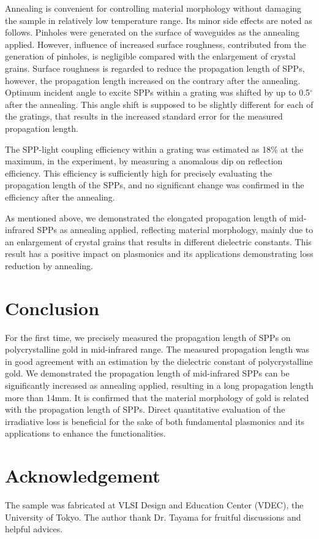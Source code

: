\documentclass[twocolumn,11pt,a4]{article}
\begin{document}
Annealing is convenient for controlling material morphology\cite{Nogues} without damaging the sample in relatively low temperature range. Its minor side effects are noted as follows.
Pinholes were generated on the surface of waveguides as the annealing applied. However, influence of increased surface roughness, contributed from the generation of pinholes, is negligible compared with the enlargement of crystal grains. Surface roughness is regarded to reduce the propagation length of SPPs\cite{Mills}, however, the propagation length increased on the contrary after the annealing.
Optimum incident angle to excite SPPs within a grating was shifted by up to 0.5$^\circ$ after the annealing.
This angle shift is supposed to be slightly different for each of the gratings, that results in the increased standard error for the measured propagation length.

The SPP-light coupling efficiency within a grating was estimated as 18\% at the maximum, in the experiment, by measuring a anomalous dip on reflection efficiency.
This efficiency is sufficiently high for precisely evaluating the propagation length of the SPPs, and no significant change was confirmed in the efficiency after the annealing.

As mentioned above, we demonstrated the elongated propagation length of mid-infrared SPPs as annealing applied, reflecting material morphology, mainly due to an enlargement of crystal grains that results in different dielectric constants. 
This result has a positive impact on plasmonics and its applications demonstrating loss reduction by annealing.

\section{Conclusion}
\label{sec:conclusion}
For the first time, we precisely measured the propagation length of SPPs on polycrystalline gold in mid-infrared range. 
The measured propagation length was in good agreement with an estimation by the dielectric constant of polycrystalline gold.
We demonstrated the propagation length of mid-infrared SPPs can be significantly increased as annealing applied, resulting in a long propagation length more than 14mm. 
It is confirmed that the material morphology of gold is related with the propagation length of SPPs. 
Direct quantitative evaluation of the irradiative loss is beneficial for the sake of both fundamental plasmonics and its applications to enhance the functionalities.

\section*{Acknowledgement}
The sample was fabricated at VLSI Design and Education Center (VDEC), the University of Tokyo.
The author thank Dr. Tayama for fruitful discussions and helpful advices.




\newpage
\end{document}
